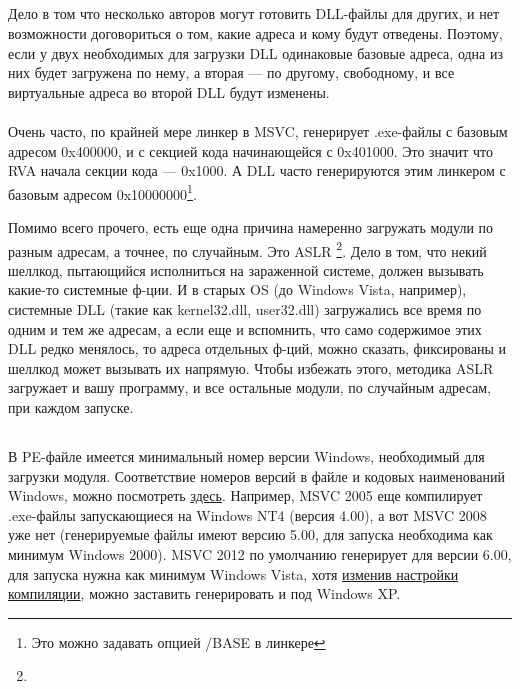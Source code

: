 \subsection{}
Дело в том что несколько авторов могут готовить DLL-файлы для других, и нет возможности договориться о том, какие адреса и кому будут отведены.
Поэтому, если у двух необходимых для загрузки DLL одинаковые базовые адреса, одна из них будет загружена по нему, а вторая --- по другому, свободному, и все виртуальные адреса во второй DLL будут изменены. \\
\\
Очень часто, по крайней мере линкер в \ac{MSVC}, генерирует .exe-файлы с базовым адресом 0x400000, и с секцией кода начинающейся с 0x401000. Это значит что \ac{RVA} начала секции кода --- 0x1000. 
А DLL часто генерируются этим линкером с базовым адресом 0x10000000\footnote{Это можно задавать опцией /BASE в линкере}.

Помимо всего прочего, есть еще одна причина намеренно загружать модули по разным адресам, а точнее, по случайным. 
Это \ac{ASLR}
\footnote{}.
Дело в том, что некий шеллкод, пытающийся исполниться на зараженной системе, должен вызывать какие-то системные ф-ции. И в старых \ac{OS} (до Windows Vista, например), системные DLL (такие как kernel32.dll, user32.dll) загружались все время
по одним и тем же адресам, а если еще и вспомнить, что само содержимое этих DLL редко менялось, то адреса отдельных
ф-ций, можно сказать, фиксированы и шеллкод может вызывать их напрямую. Чтобы избежать этого, методика \ac{ASLR} загружает
и вашу программу, и все остальные модули, по случайным адресам, при каждом запуске.

\subsection{}

В PE-файле имеется минимальный номер версии Windows, необходимый для загрузки модуля. 
Соответствие номеров версий в файле и кодовых наименований Windows, можно посмотреть 
\href{https://en.wikipedia.org/wiki/Windows_NT#Releases}{здесь}.
Например, \ac{MSVC} 2005 еще компилирует .exe-файлы запускающиеся на Windows NT4 (версия 4.00),
а вот \ac{MSVC} 2008 уже нет (генерируемые файлы имеют версию 5.00, для запуска необходима как минимум Windows 2000).
\ac{MSVC} 2012 по умолчанию генерирует для версии 6.00, для запуска нужна как минимум Windows Vista, хотя 
\href{http://blogs.msdn.com/b/vcblog/archive/2012/10/08/10357555.aspx}{изменив настройки компиляции}, 
можно заставить генерировать и под Windows XP.

